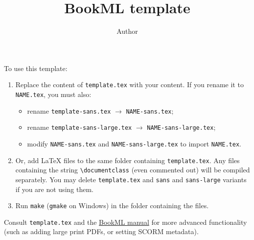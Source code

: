 \documentclass[british,oneside,11pt]{amsart}
\title{BookML template}
\author{Author}
\begin{document}
\maketitle

To use this template:
\begin{enumerate}
  \item Replace the content of \texttt{template.tex} with your content. If you rename it to \texttt{NAME.tex}, you must also:
  \begin{itemize}
      \item rename \texttt{template-sans.tex} $\to$ \texttt{NAME-sans.tex};
      \item rename \texttt{template-sans-large.tex} $\to$ \texttt{NAME-sans-large.tex};
      \item modify \texttt{NAME-sans.tex} and \texttt{NAME-sans-large.tex} to import \texttt{NAME.tex}.
  \end{itemize}
  \item Or, add \LaTeX{} files to the same folder containing \texttt{template.tex}. Any files containing the string \verb|\documentclass| (even commented out) will be compiled separately. You may delete \texttt{template.tex} and \texttt{sans} and \texttt{sans-large} variants if you are not using them.
  \item Run \texttt{make} (\texttt{gmake} on Windows) in the folder containing the files.
\end{enumerate}
Consult \texttt{template.tex} and the \href{https://vlmantova.gitthub.io/bookml/}{BookML manual} for more advanced functionality (such as adding large print PDFs, or setting SCORM metadata).

\bigskip
\end{document}
